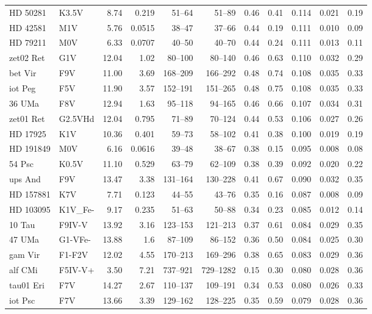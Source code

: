 \documentclass[11pt,a4paper]{article}
\begin{document}
{\begin{longtable}{llrrrrrrrrr}
HD  50281 & K3.5V & 8.74 & 0.219 & 51--64 & 51--89 & 0.46 & 0.41 & 0.114 & 0.021 & 0.19 \\
HD  42581 & M1V & 5.76 & 0.0515 & 38--47 & 37--66 & 0.44 & 0.19 & 0.111 & 0.010 & 0.09 \\
HD  79211 & M0V & 6.33 & 0.0707 & 40--50 & 40--70 & 0.44 & 0.24 & 0.111 & 0.013 & 0.11 \\
zet02 Ret & G1V & 12.04 & 1.02 & 80--100 & 80--140 & 0.46 & 0.63 & 0.110 & 0.032 & 0.29 \\
bet Vir & F9V & 11.00 & 3.69 & 168--209 & 166--292 & 0.48 & 0.74 & 0.108 & 0.035 & 0.33 \\
iot Peg & F5V & 11.90 & 3.57 & 152--191 & 151--265 & 0.48 & 0.75 & 0.108 & 0.035 & 0.33 \\
36 UMa & F8V & 12.94 & 1.63 & 95--118 & 94--165 & 0.46 & 0.66 & 0.107 & 0.034 & 0.31 \\
zet01 Ret & G2.5VHd & 12.04 & 0.795 & 71--89 & 70--124 & 0.44 & 0.53 & 0.106 & 0.027 & 0.26 \\
HD  17925 & K1V & 10.36 & 0.401 & 59--73 & 58--102 & 0.41 & 0.38 & 0.100 & 0.019 & 0.19 \\
HD 191849 & M0V & 6.16 & 0.0616 & 39--48 & 38--67 & 0.38 & 0.15 & 0.095 & 0.008 & 0.08 \\
54 Psc & K0.5V & 11.10 & 0.529 & 63--79 & 62--109 & 0.38 & 0.39 & 0.092 & 0.020 & 0.22 \\
ups And & F9V & 13.47 & 3.38 & 131--164 & 130--228 & 0.41 & 0.67 & 0.090 & 0.032 & 0.35 \\
HD 157881 & K7V & 7.71 & 0.123 & 44--55 & 43--76 & 0.35 & 0.16 & 0.087 & 0.008 & 0.09 \\
HD 103095 & K1V\_Fe- & 9.17 & 0.235 & 51--63 & 50--88 & 0.34 & 0.23 & 0.085 & 0.012 & 0.14 \\
10 Tau & F9IV-V & 13.92 & 3.16 & 123--153 & 121--213 & 0.37 & 0.61 & 0.084 & 0.029 & 0.35 \\
47 UMa & G1-VFe- & 13.88 & 1.6 & 87--109 & 86--152 & 0.36 & 0.50 & 0.084 & 0.025 & 0.30 \\
gam Vir & F1-F2V & 12.02 & 4.55 & 170--213 & 169--296 & 0.38 & 0.65 & 0.083 & 0.029 & 0.36 \\
alf CMi & F5IV-V+ & 3.50 & 7.21 & 737--921 & 729--1282 & 0.15 & 0.30 & 0.080 & 0.028 & 0.36 \\
tau01 Eri & F7V & 14.27 & 2.67 & 110--137 & 109--191 & 0.34 & 0.53 & 0.080 & 0.026 & 0.33 \\
iot Psc & F7V & 13.66 & 3.39 & 129--162 & 128--225 & 0.35 & 0.59 & 0.079 & 0.028 & 0.36 \\

\end{longtable}}
\end{document}

